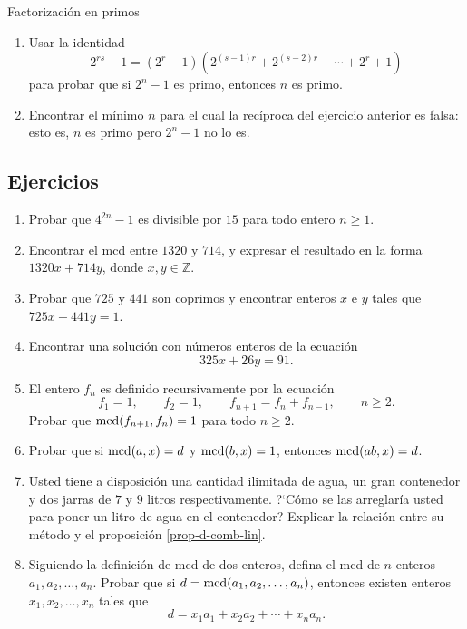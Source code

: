 \begin{section}{Factorización en primos}
\begin{enumerate}
\item Usar la identidad
$$
2^{rs} -1 = (2^r-1) (2^{(s-1)r}+2^{(s-2)r}+\cdots +2^r+1)
$$
para probar que si $2^n-1$ es primo, entonces $n$ es primo.

\item Encontrar el mínimo $n$ para el cual la recíproca del ejercicio anterior
es falsa: esto es, $n$ es primo pero $2^n-1$ no lo es.
\end{enumerate}
	
	
\section{Ejercicios}	
\begin{enumerate}
\item Probar que $4^{2n}-1$ es divisible por $15$ para todo entero $n\ge
1$.
\item Encontrar el mcd entre $1320$ y $714$, y expresar el resultado en la
forma $1320x+714y$, don\-de $x,y \in \mathbb Z$.
\item Probar que $725$ y $441$ son coprimos y encontrar enteros $x$ e $y$
tales que $725x+441y=1$.
\item Encontrar una solución con números enteros de la ecuación
$$ 325x+26y=91.$$
\item El entero $f_n$ es definido recursivamente por la ecuación
$$
f_1=1,\qquad f_2=1, \qquad f_{n+1} = f_n + f_{n-1}, \qquad
\text{$n\ge 2$}.
$$
Probar que $\operatorname{mcd}(f_{n+1},f_n)=1$ para todo $n\ge2$.

\item Probar que si $\operatorname{mcd}(a,x)=d$ y $\operatorname{mcd}(b,x)=1$, entonces $\operatorname{mcd}(ab,x)=d$.

\item Usted tiene a disposición una cantidad ilimitada de agua, un gran
contenedor y dos jarras de $7$ y $9$ litros respectivamente. ?`Cómo se
las arreglaría usted para poner un litro de agua en el contenedor?
Explicar la relación entre su método y el proposición \ref{prop-d-comb-lin}.

\item Siguiendo la definición de mcd de dos enteros, defina el mcd de
$n$ enteros $a_1,a_2,\ldots,a_n$. Probar que si
$d=\operatorname{mcd}(a_1,a_2,\ldots,a_n)$, entonces existen enteros
$x_1,x_2,\ldots,x_n$ tales que
$$
d=x_1a_1+x_2a_2+\cdots+x_na_n.
$$


\end{enumerate}
\end{section}
